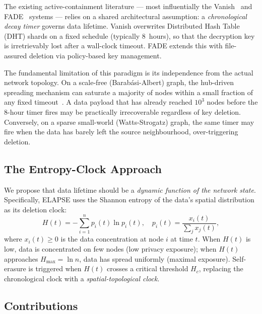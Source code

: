 \documentclass[review,12pt]{elsarticle}
\newcommand{\Hc}{H_c}
\newcommand{\Hmax}{H_{\max}}
\begin{document}
The existing active-containment literature --- most influentially the
Vanish~\cite{geambasu2009vanish} and FADE~\cite{tang2010fade} systems --- relies
on a shared architectural assumption: a \emph{chronological decay timer} governs
data lifetime. Vanish overwrites Distributed Hash Table (DHT) shards on a fixed
schedule (typically 8~hours), so that the decryption key is irretrievably lost
after a wall-clock timeout. FADE extends this with file-assured deletion via
policy-based key management.

The fundamental limitation of this paradigm is its independence from the actual
network topology. On a scale-free (Barab\'asi-Albert) graph, the hub-driven
spreading mechanism can saturate a majority of nodes within a small fraction of
any fixed timeout~\cite{barabasi1999emergence,pastor2015epidemic}. A data payload
that has already reached $10^3$ nodes before the 8-hour timer fires may be
practically irrecoverable regardless of key deletion. Conversely, on a
sparse small-world (Watts-Strogatz) graph, the same timer may fire when the
data has barely left the source neighbourhood, over-triggering deletion.

\subsection{The Entropy-Clock Approach}

We propose that data lifetime should be a \emph{dynamic function of the
network state}. Specifically, ELAPSE uses the Shannon entropy of the data's
spatial distribution as its deletion clock:
\begin{equation}
  H(t) = -\sum_{i=1}^{n} p_i(t) \ln p_i(t), \quad
  p_i(t) = \frac{x_i(t)}{\sum_j x_j(t)},
  \label{eq:entropy}
\end{equation}
where $x_i(t) \geq 0$ is the data concentration at node $i$ at time $t$.
When $H(t)$ is low, data is concentrated on few nodes (low privacy exposure);
when $H(t)$ approaches $\Hmax = \ln n$, data has spread uniformly (maximal
exposure). Self-erasure is triggered when $H(t)$ crosses a critical
threshold $\Hc$, replacing the chronological clock with a
\emph{spatial-topological clock}.

\subsection{Contributions}
\end{document}
